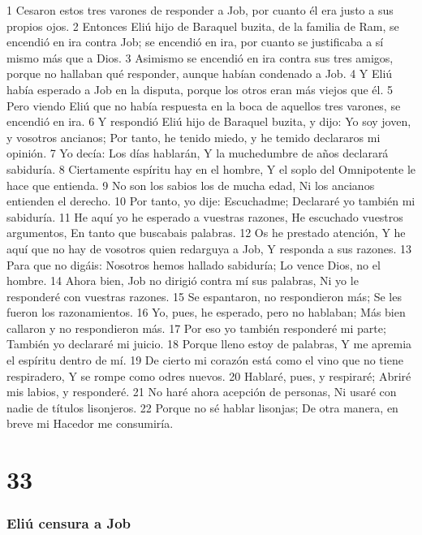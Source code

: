 1 Cesaron estos tres varones de responder a Job, por cuanto él era justo a sus propios ojos.  
2 Entonces Eliú hijo de Baraquel buzita, de la familia de Ram, se encendió en ira contra Job; se encendió en ira, por cuanto se justificaba a sí mismo más que a Dios.  
3 Asimismo se encendió en ira contra sus tres amigos, porque no hallaban qué responder, aunque habían condenado a Job.  
4 Y Eliú había esperado a Job en la disputa, porque los otros eran más viejos que él.  
5 Pero viendo Eliú que no había respuesta en la boca de aquellos tres varones, se encendió en ira.  
6 Y respondió Eliú hijo de Baraquel buzita, y dijo:  
Yo soy joven, y vosotros ancianos;  
Por tanto, he tenido miedo, y he temido declararos mi opinión.  
7 Yo decía: Los días hablarán,  
Y la muchedumbre de años declarará sabiduría.  
8 Ciertamente espíritu hay en el hombre,  
Y el soplo del Omnipotente le hace que entienda.  
9 No son los sabios los de mucha edad,  
Ni los ancianos entienden el derecho.  
10 Por tanto, yo dije: Escuchadme;  
Declararé yo también mi sabiduría.  
11 He aquí yo he esperado a vuestras razones,  
He escuchado vuestros argumentos,  
En tanto que buscabais palabras.  
12 Os he prestado atención,  
Y he aquí que no hay de vosotros quien redarguya a Job,  
Y responda a sus razones.  
13 Para que no digáis: Nosotros hemos hallado sabiduría;  
Lo vence Dios, no el hombre.  
14 Ahora bien, Job no dirigió contra mí sus palabras,  
Ni yo le responderé con vuestras razones.  
15 Se espantaron, no respondieron más;  
Se les fueron los razonamientos.  
16 Yo, pues, he esperado, pero no hablaban;  
Más bien callaron y no respondieron más.  
17 Por eso yo también responderé mi parte;  
También yo declararé mi juicio. 
18 Porque lleno estoy de palabras, 
Y me apremia el espíritu dentro de mí.  
19 De cierto mi corazón está como el vino que no tiene respiradero,  
Y se rompe como odres nuevos.  
20 Hablaré, pues, y respiraré;  
Abriré mis labios, y responderé.  
21 No haré ahora acepción de personas,  
Ni usaré con nadie de títulos lisonjeros.  
22 Porque no sé hablar lisonjas;  
De otra manera, en breve mi Hacedor me consumiría.  

\chapter{33}

\subsection*{Eliú censura a Job}  

